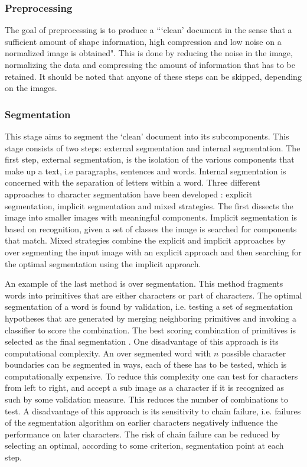 	\subsubsection{Preprocessing}
	\label{sss:introduction:offline:preprocessing}
		The goal of preprocessing is to produce a ```clean' document in the sense that a sufficient amount of shape information, high compression and low noise on a normalized image is obtained"\cite[p. 219]{arica2001overview}. This is done by reducing the noise in the image, normalizing the data and compressing the amount of information that has to be retained. It should be noted that anyone of these steps can be skipped, depending on the images.

	\subsubsection{Segmentation}
	\label{sss:introduction:offline:segmentation}
		This stage aims to segment the `clean' document into its subcomponents. This stage consists of two steps: external segmentation and internal segmentation. The first step, external segmentation, is the isolation of the various components that make up a text, i.e paragraphs, sentences and words. Internal segmentation is concerned with the separation of letters within a word. Three different approaches to character segmentation have been developed \cite{casey1996survey}: explicit segmentation, implicit segmentation and mixed strategies. The first dissects the image into smaller images with meaningful components. Implicit segmentation is based on recognition, given a set of classes the image is searched for components that match. Mixed strategies combine the explicit and implicit approaches by over segmenting the input image with an explicit approach and then searching for the optimal segmentation using the implicit approach. 

		An example of the last method is over segmentation. This method fragments words into primitives that are either characters or part of characters. The optimal segmentation of a word is found by validation, i.e. testing a set of segmentation hypotheses that are generated by merging neighboring primitives and invoking a classifier to score the combination. The best scoring combination of primitives is selected as the final segmentation \cite{camastra2007svm}. One disadvantage of this approach is its computational complexity.	An over segmented word with $n$ possible character boundaries can be segmented in  ways, each of these has to be tested, which is computationally expensive. To reduce this complexity one can test for characters from left to right, and accept a sub image as a character if it is recognized as such by some validation measure. This reduces the number of combinations to test. A disadvantage of this approach is its sensitivity to chain failure, i.e. failures of the segmentation algorithm on earlier characters negatively influence the performance on later characters. The risk of chain failure can be reduced by selecting an optimal, according to some criterion, segmentation point at each step\cite{lee2012binary}.

